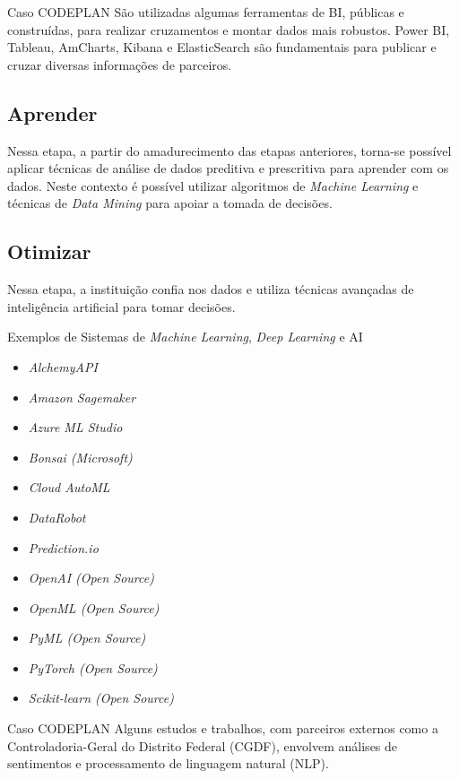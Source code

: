     \begin{env-caso}{Caso CODEPLAN}
        São utilizadas algumas ferramentas de BI, públicas e construídas, para realizar cruzamentos e montar dados mais robustos. Power BI, Tableau, AmCharts, Kibana e ElasticSearch são fundamentais para publicar e cruzar diversas informações de parceiros.
    \end{env-caso}
    
    \subsection{Aprender}\label{sec:aprender}
    
    Nessa etapa, a partir do amadurecimento das etapas anteriores, torna-se possível aplicar técnicas de análise de dados preditiva e prescritiva para aprender com os dados. Neste contexto é possível utilizar algoritmos de \emph{Machine Learning} e 
    técnicas de \emph{Data Mining} para apoiar a tomada de decisões.

    \subsection{Otimizar}\label{sec:otimizar}

    Nessa etapa, a instituição confia nos dados e utiliza técnicas avançadas de inteligência artificial para tomar decisões.  

    \begin{env-sistemas}{Exemplos de Sistemas de \emph{Machine Learning}, \emph{Deep Learning} e AI}
         \begin{multicols}{2}
            \begin{itemize}
                \item \emph{AlchemyAPI}
                \item \emph{Amazon Sagemaker}
                \item \emph{Azure ML Studio}
                \item \emph{Bonsai (Microsoft)}
                \item \emph{Cloud AutoML}
                \item \emph{DataRobot}
                \item \emph{Prediction.io}
                \item \emph{OpenAI (Open Source)}
                \item \emph{OpenML (Open Source)}
                \item \emph{PyML (Open Source)}
                \item \emph{PyTorch (Open Source)}
                \item \emph{Scikit-learn (Open Source)}
            \end{itemize}
        \end{multicols}
    \end{env-sistemas}

    \begin{env-exemplo}{Caso CODEPLAN}
        Alguns estudos e trabalhos, com parceiros externos como a Controladoria-Geral do Distrito Federal (CGDF), envolvem análises de sentimentos e processamento de linguagem natural (NLP).
    \end{env-exemplo}
    
